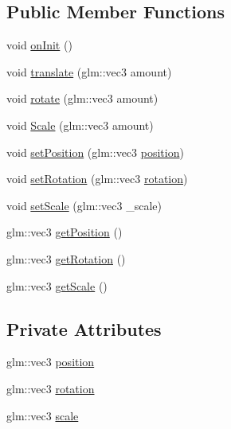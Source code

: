 \subsection*{Public Member Functions}
\begin{DoxyCompactItemize}
\item 
void \hyperlink{classtmsengine_1_1_transform_a761046214917103b7286e36cde981c00}{on\+Init} ()
\item 
void \hyperlink{classtmsengine_1_1_transform_a9b5c3f77a33d065a7c35c3f125f411c9}{translate} (glm\+::vec3 amount)
\item 
void \hyperlink{classtmsengine_1_1_transform_a4252393f36c4dac7665366dc6d046b2c}{rotate} (glm\+::vec3 amount)
\item 
void \hyperlink{classtmsengine_1_1_transform_abb597d75f70663d2eb39de63d8d55fb7}{Scale} (glm\+::vec3 amount)
\item 
void \hyperlink{classtmsengine_1_1_transform_a3dee28280ad81f1e45b1b85a1a6fe400}{set\+Position} (glm\+::vec3 \hyperlink{classtmsengine_1_1_transform_a588c0d056219dbe15a97c727a36880aa}{position})
\item 
void \hyperlink{classtmsengine_1_1_transform_a64a3902ef95913ce9cdcc586060e8478}{set\+Rotation} (glm\+::vec3 \hyperlink{classtmsengine_1_1_transform_a3dfc7b3c7d5cebed1168fd124a81803c}{rotation})
\item 
void \hyperlink{classtmsengine_1_1_transform_ae70b645863286dd4ef06b2ff3dc93db9}{set\+Scale} (glm\+::vec3 \+\_\+scale)
\item 
glm\+::vec3 \hyperlink{classtmsengine_1_1_transform_a44891a7afedd2d98670f4031e44d62c4}{get\+Position} ()
\item 
glm\+::vec3 \hyperlink{classtmsengine_1_1_transform_a0a1fcbfe44cf518b01a3b2806e4fd305}{get\+Rotation} ()
\item 
glm\+::vec3 \hyperlink{classtmsengine_1_1_transform_aa42e86916a3979d625d60beb91f982c6}{get\+Scale} ()
\end{DoxyCompactItemize}
\subsection*{Private Attributes}
\begin{DoxyCompactItemize}
\item 
glm\+::vec3 \hyperlink{classtmsengine_1_1_transform_a588c0d056219dbe15a97c727a36880aa}{position}
\item 
glm\+::vec3 \hyperlink{classtmsengine_1_1_transform_a3dfc7b3c7d5cebed1168fd124a81803c}{rotation}
\item 
glm\+::vec3 \hyperlink{classtmsengine_1_1_transform_a7a166d9bb060a56975ffb75dba91ee58}{scale}
\end{DoxyCompactItemize}


